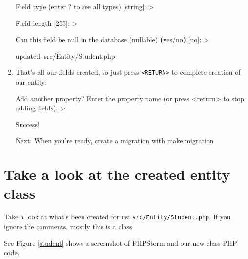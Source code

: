 \documentclass[a4paperpaper,openright]{book}
\newenvironment{Shaded}{}{}
\newcommand{\BuiltInTok}[1]{#1}
\newcommand{\ExtensionTok}[1]{#1}
\newcommand{\KeywordTok}[1]{\textcolor[rgb]{0.00,0.44,0.13}{\textbf{#1}}}
\newcommand{\NormalTok}[1]{#1}
\newcommand{\OperatorTok}[1]{\textcolor[rgb]{0.40,0.40,0.40}{#1}}
\newcommand{\StringTok}[1]{\textcolor[rgb]{0.25,0.44,0.63}{#1}}
\begin{document}
\begin{enumerate}
\begin{Shaded}
\begin{Highlighting}[]
     \ExtensionTok{Field}\NormalTok{ type (enter ? to see all types) [}\ExtensionTok{string}\NormalTok{]:}
     \OperatorTok{>} 

     \ExtensionTok{Field}\NormalTok{ length [255]:}
     \OperatorTok{>} 

     \ExtensionTok{Can}\NormalTok{ this field be null in the database (nullable) }\KeywordTok{(}\ExtensionTok{yes/no}\KeywordTok{)}\NormalTok{ [}\ExtensionTok{no}\NormalTok{]:}
     \OperatorTok{>} 

     \ExtensionTok{updated}\NormalTok{: src/Entity/Student.php}
\end{Highlighting}
\end{Shaded}
\item
  That's all our fields created, so just press
  \texttt{\textless{}RETURN\textgreater{}} to complete creation of our
  entity:

\begin{Shaded}
\begin{Highlighting}[]
       \ExtensionTok{Add}\NormalTok{ another property? Enter the property name (or press }\OperatorTok{<}\NormalTok{return}\OperatorTok{>}\NormalTok{ to stop adding fields)}\BuiltInTok{:}
       \OperatorTok{>} 

        \ExtensionTok{Success}\NormalTok{! }

       \ExtensionTok{Next}\NormalTok{: When you}\StringTok{'re ready, create a migration with make:migration}
\end{Highlighting}
\end{Shaded}
\end{enumerate}

\hypertarget{take-a-look-at-the-created-entity-class}{%
\section{Take a look at the created entity
class}\label{take-a-look-at-the-created-entity-class}}

Take a look at what's been created for us:
\texttt{src/Entity/Student.php}. If you ignore the comments, mostly this
is a class

See Figure \ref{student} shows a screenshot of PHPStorm and our new
class PHP code.
\end{document}
